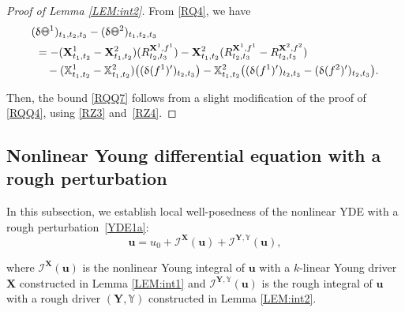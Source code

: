 \documentclass[letterpaper, 11pt,  reqno]{amsart}
\newcommand{\1}{\hspace{0.5mm}\textup{I}\hspace{0.5mm}}
\newcommand{\I}{\mathcal{I}}
\newcommand{\noi}{\noindent}
\newcommand{\updl}{\updelta}
\newcommand{\uu}{\mathbf{u}}
\newcommand{\XXb}{\mathbb{X}}
\newcommand{\YYb}{\mathbb{Y}}
\newcommand{\XX}{\mathbf{X}}
\newcommand{\YY}{\mathbf{Y}}
\def\doublestroke#1{\pdfliteral{1 Tr .35 w}#1\pdfliteral{0 Tr 0 w}}
\newcommand{\Taa}{\doublestroke{\Theta}}
\numberwithin{equation}{section}
\numberwithin{theorem}{section}
\begin{document}
\begin{proof}[Proof of Lemma \ref{LEM:int2}]
\noi
From \eqref{RQ4}, we have 
\begin{align}
\begin{split}
( & \updl  \Taa^1)_{t_1, t_2, t_3}
- (\updl  \Taa^2)_{t_1, t_2, t_3}\\
& = -
(\XX_{t_1,t_2}^1-\XX_{t_1,t_2}^2) (R^{\XX^1, f^1}_{t_2,t_3})
-
\XX_{t_1,t_2}^2 (R^{\XX^1, f^1}_{t_2,t_3}- R^{\XX^2, f^2}_{t_2,t_3})\\
& \quad 
- (\XXb^1_{t_1,t_2}-\XXb^2_{t_1,t_2})\big( (\updl (f^1)')_{t_2,t_3}\big)
- \XXb^2_{t_1,t_2}\big( (\updl (f^1)')_{t_2,t_3}- (\updl (f^2)')_{t_2,t_3}\big).
\end{split}
\label{RZ4}
\end{align}

\noi
Then, the bound \eqref{RQQ7}
follows from a slight modification of the proof of \eqref{RQQ4}, 
using \eqref{RZ3} and~\eqref{RZ4}.
\end{proof}
















\subsection{Nonlinear Young differential equation
with a rough perturbation}
\label{SUBSEC:Y5}


In this subsection, we establish  local well-posedness
of the nonlinear YDE with a rough 
perturbation~\eqref{YDE1a}:
\begin{equation}
\uu = u_0 + \I^\XX(\uu) + \I^{\YY, \YYb}(\uu), 
\label{RDE1}
\end{equation}


\noi
where $\I^\XX(\uu)$ is the nonlinear Young integral of $\uu$
with a $k$-linear Young driver $\XX$ constructed in Lemma \ref{LEM:int1} and 
$\I^{\YY, \YYb}(\uu)$ is the rough integral of $\uu$
with a rough driver $(\YY, \YYb)$
constructed in 
Lemma \ref{LEM:int2}.
\end{document}
